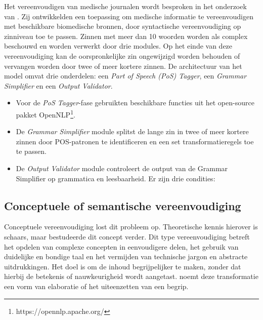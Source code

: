 Het vereenvoudigen van medische journalen wordt besproken in het onderzoek van \textcite{Kandula2010}. Zij ontwikkelden een toepassing om medische informatie te vereenvoudigen met beschikbare biomedische bronnen, door syntactische vereenvoudiging op zinniveau toe te passen. Zinnen met meer dan 10 woorden worden als complex beschouwd en worden verwerkt door drie modules. Op het einde van deze vereenvoudiging kan de oorspronkelijke zin ongewijzigd worden behouden of vervangen worden door twee of meer kortere zinnen. De architectuur van het model omvat drie onderdelen: een \textit{Part of Speech (PoS) Tagger}, een \textit{Grammar Simplifier} en een \textit{Output Validator}. 

\begin{itemize}
	\item Voor de \textit{PoS Tagger}-fase gebruikten \textcite{Kandula2010} beschikbare functies uit het open-source pakket OpenNLP\footnote{https://opennlp.apache.org/}.
	\item De \textit{Grammar Simplifier} module splitst de lange zin in twee of meer kortere zinnen door POS-patronen te identificeren en een set transformatieregels toe te passen.
	\item De \textit{Output Validator} module controleert de output van de Grammar Simplifier op grammatica en leesbaarheid. Er zijn drie condities:
\end{itemize}  



\subsection{Conceptuele of semantische vereenvoudiging}

Conceptuele vereenvoudiging lost dit probleem op. Theoretische kennis hierover is schaars, maar \textcite{Siddharthan2006} bestudeerde dit concept verder. Dit type vereenvoudiging betreft het opdelen van complexe concepten in eenvoudigere delen, het gebruik van duidelijke en bondige taal en het vermijden van technische jargon en abstracte uitdrukkingen. Het doel is om de inhoud begrijpelijker te maken, zonder dat hierbij de betekenis of nauwkeurigheid wordt aangetast. \textcite{Siddharthan2006} noemt deze transformatie een vorm van elaboratie of het uiteenzetten van een begrip.

